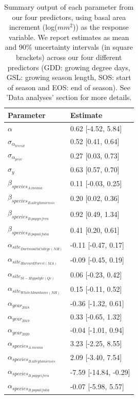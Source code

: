\begin{table}[ht]
\centering
\caption{Summary output of each parameter from our four predictors, using basal area increment (log($mm^2$)) as the response variable. We report estimates as mean and 90\% uncertainty intervals (in square brackets) across our four different predictors (GDD: growing degree days, GSL: growing season length, SOS: start of season and EOS: end of season). See 'Data analyses' section for more details.} 
\label{tab:BAItab}
\begin{tabular}{ll}
  \hline
Parameter & Estimate \\ 
  \hline
$\alpha$ & 0.62 [-4.52, 5.84] \\ 
  $\sigma_{\alpha_{treeid}}$ & 0.52 [0.41, 0.64] \\ 
  $\sigma_{\alpha_{prov}}$ & 0.27 [0.03, 0.73] \\ 
  $\sigma_{y}$ & 0.63 [0.57, 0.70] \\ 
  $\beta_{species_{A. incana}}$ & 0.11 [-0.03, 0.25] \\ 
  $\beta_{species_{B. alleghaniensis}}$ & 0.20 [0.02, 0.36] \\ 
  $\beta_{species_{B. papyrifera}}$ & 0.92 [0.49, 1.34] \\ 
  $\beta_{species_{B. populifolia}}$ & 0.41 [0.20, 0.61] \\ 
  $\alpha_{site_{Dartmouth College (NH)}}$ & -0.11 [-0.47, 0.17] \\ 
  $\alpha_{site_{Harvard Forest (MA)}}$ & -0.09 [-0.45, 0.19] \\ 
  $\alpha_{site_{St-Hippolyte (Qc)}}$ & 0.06 [-0.23, 0.42] \\ 
  $\alpha_{site_{White Mountains (NH)}}$ & 0.15 [-0.11, 0.52] \\ 
  $\alpha_{year_{2018}}$ & -0.36 [-1.32, 0.61] \\ 
  $\alpha_{year_{2019}}$ & 0.33 [-0.65, 1.32] \\ 
  $\alpha_{year_{2020}}$ & -0.04 [-1.01, 0.94] \\ 
  $\alpha_{species_{A. incana}}$ & 3.23 [-2.25, 8.55] \\ 
  $\alpha_{species_{B. alleghaniensis}}$ & 2.09 [-3.40, 7.54] \\ 
  $\alpha_{species_{B. papyrifera}}$ & -7.59 [-14.84, -0.29] \\ 
  $\alpha_{species_{B. populifolia}}$ & -0.07 [-5.98, 5.57] \\ 
   \hline
\end{tabular}
\end{table}

